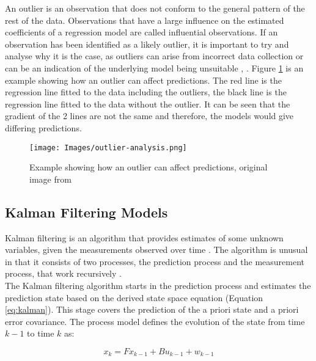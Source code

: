 An outlier is an observation that does not conform to the general pattern of the rest of the data. Observations that have a large influence on the estimated coefficients of a regression model are called influential observations. If an observation has been identified as a likely outlier, it is important to try and analyse why it is the case, as outliers can arise from incorrect data collection or can be an indication of the underlying model being unsuitable \cite{forecasting-book}, \cite{m2s2-notes}. Figure \ref{fig:outlier} is an example showing how an outlier can affect predictions. The red line is the regression line fitted to the data including the outliers, the black line is the regression line fitted to the data without the outlier. It can be seen that the gradient of the 2 lines are not the same and therefore, the models would give differing predictions.  

\begin{figure}[H]
\begin{center}
    \texttt{[image: Images/outlier-analysis.png]}
    \caption{Example showing how an outlier can affect predictions, original image from \cite{forecasting-book}}
    \label{fig:outlier}
\end{center}
\end{figure}

\subsection{Kalman Filtering Models}
\label{section:kalman-models-research}

Kalman filtering is an algorithm that provides estimates of some unknown variables, given the measurements observed over time \cite{kalman-korean}. The algorithm is unusual in that it consists of two processes, the prediction process and the measurement process, that work recursively \cite{kalman-malay}.  \\

The Kalman filtering algorithm starts in the prediction process and estimates the prediction state based on the derived state space equation (Equation \ref{eq:kalman}). This stage covers the prediction of the a priori state and a priori error covariance. The process model defines the evolution of the state from time $k-1$ to time $k$ as:

\begin{equation}
\label{eq:kalman}
    x_k = Fx_{k-1} + Bu_{k-1} + w_{k-1}
\end{equation}

